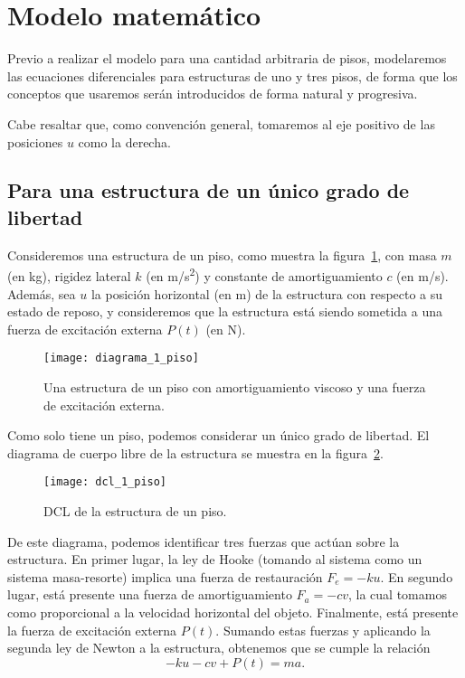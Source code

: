 \section{Modelo matemático}

Previo a realizar el modelo para una cantidad arbitraria de pisos, modelaremos las ecuaciones diferenciales para estructuras de uno y tres pisos, de forma que los conceptos que usaremos serán introducidos de forma natural y progresiva.

Cabe resaltar que, como convención general, tomaremos al eje positivo de las posiciones \(u\) como la derecha.

\subsection{Para una estructura de un único grado de libertad}

Consideremos una estructura de un piso, como muestra la figura~\ref{fig:1-floor-diagram}, con masa \(m\) (en \si{kg}), rigidez lateral \(k\) (en \si{m/s^2}) y constante de amortiguamiento \(c\) (en \si{m/s}). Además, sea \(u\) la posición horizontal (en \si{m}) de la estructura con respecto a su estado de reposo, y consideremos que la estructura está siendo sometida a una fuerza de excitación externa \(P(t)\) (en \si{N}).

\begin{figure}[ht!]
    \centering
    \texttt{[image: diagrama\_1\_piso]}
    \caption{Una estructura de un piso con amortiguamiento viscoso y una fuerza de excitación externa.}
    \label{fig:1-floor-diagram}
\end{figure}

Como solo tiene un piso, podemos considerar un único grado de libertad. El diagrama de cuerpo libre de la estructura se muestra en la figura~\ref{fig:1-floor-dcl}.

\begin{figure}[ht!]
    \centering
    \texttt{[image: dcl\_1\_piso]}
    \caption{DCL de la estructura de un piso.}
    \label{fig:1-floor-dcl}
\end{figure}

De este diagrama, podemos identificar tres fuerzas que actúan sobre la estructura. En primer lugar, la ley de Hooke (tomando al sistema como un sistema masa-resorte) implica una fuerza de restauración \(F_e = -ku\). En segundo lugar, está presente una fuerza de amortiguamiento \(F_a = -cv\), la cual tomamos como proporcional a la velocidad horizontal del objeto. Finalmente, está presente la fuerza de excitación externa \(P(t)\). Sumando estas fuerzas y aplicando la segunda ley de Newton a la estructura, obtenemos que se cumple la relación
\begin{equation}\label{eqn:almost}
    -ku - cv + P(t) = ma
.\end{equation}

